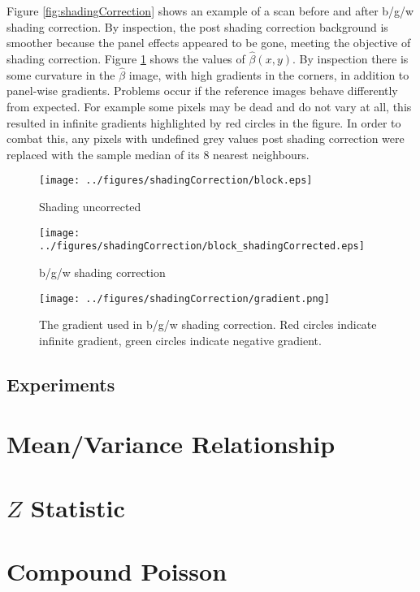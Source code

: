 \documentclass[a4paper]{proc}
\begin{document}
Figure \ref{fig:shadingCorrection} shows an example of a scan before and after b/g/w shading correction. By inspection, the post shading correction background is smoother because the panel effects appeared to be gone, meeting the objective of shading correction. Figure \ref{fig:shadingCorrection_grad} shows the values of $\widehat{\beta}(x,y)$. By inspection there is some curvature in the $\widehat{\beta}$ image, with high gradients in the corners, in addition to panel-wise gradients. Problems occur if the reference images behave differently from expected. For example some pixels may be dead and do not vary at all, this resulted in infinite gradients highlighted by red circles in the figure. In order to combat this, any pixels with undefined grey values post shading correction were replaced with the sample median of its 8 nearest neighbours.



\begin{figure*}
	\centering
	\begin{subfigure}{0.45\textwidth}
		\centering
		\texttt{[image: ../figures/shadingCorrection/block.eps]}
		\caption{Shading uncorrected}
	\end{subfigure}
	\begin{subfigure}{0.45\textwidth}
		\centering
		\texttt{[image: ../figures/shadingCorrection/block\_shadingCorrected.eps]}
		\caption{b/g/w shading correction}
	\end{subfigure}
	\caption{A x-ray CT scan image before and after b/g/w shading correction.}
	\label{fig:shadingCorrection}
\end{figure*}

\begin{figure}
	\texttt{[image: ../figures/shadingCorrection/gradient.png]}
	\caption{The gradient used in b/g/w shading correction. Red circles indicate infinite gradient, green circles indicate negative gradient.}
	\label{fig:shadingCorrection_grad}
\end{figure}

\subsection{Experiments}

\section{Mean/Variance Relationship}

\section{$Z$ Statistic}

\section{Compound Poisson}



\end{document}
